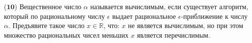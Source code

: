 ($\mathbf{10}$)
Вещественное число $\alpha$ называется вычислимым, если существует алгоритм, который по рациональному числу $\epsilon$ выдает
рациональное $\epsilon$-приближение к числу $\alpha$. Предъявите такое число $x \in \mathbb{R}$, что: $x$ не является
вычислимым, но при этом множество рациональных чисел меньших $x$ является перечислимым.